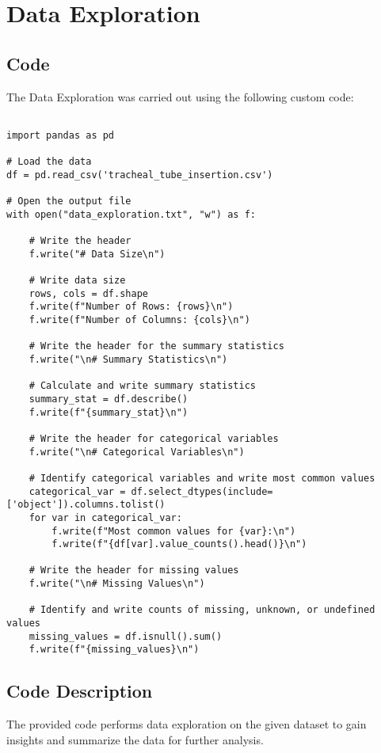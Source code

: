 \documentclass[11pt]{article}
\begin{document}
\section{Data Exploration}
\subsection{{Code}}
The Data Exploration was carried out using the following custom code:

\begin{verbatim}

import pandas as pd

# Load the data
df = pd.read_csv('tracheal_tube_insertion.csv')

# Open the output file
with open("data_exploration.txt", "w") as f:

    # Write the header
    f.write("# Data Size\n")
    
    # Write data size
    rows, cols = df.shape
    f.write(f"Number of Rows: {rows}\n")
    f.write(f"Number of Columns: {cols}\n")

    # Write the header for the summary statistics
    f.write("\n# Summary Statistics\n")

    # Calculate and write summary statistics
    summary_stat = df.describe()
    f.write(f"{summary_stat}\n")

    # Write the header for categorical variables
    f.write("\n# Categorical Variables\n")

    # Identify categorical variables and write most common values
    categorical_var = df.select_dtypes(include=['object']).columns.tolist()
    for var in categorical_var:
        f.write(f"Most common values for {var}:\n")
        f.write(f"{df[var].value_counts().head()}\n")

    # Write the header for missing values
    f.write("\n# Missing Values\n")

    # Identify and write counts of missing, unknown, or undefined values
    missing_values = df.isnull().sum()
    f.write(f"{missing_values}\n")

\end{verbatim}

\subsection{Code Description}

The provided code performs data exploration on the given dataset to gain insights and summarize the data for further analysis. 
\end{document}
